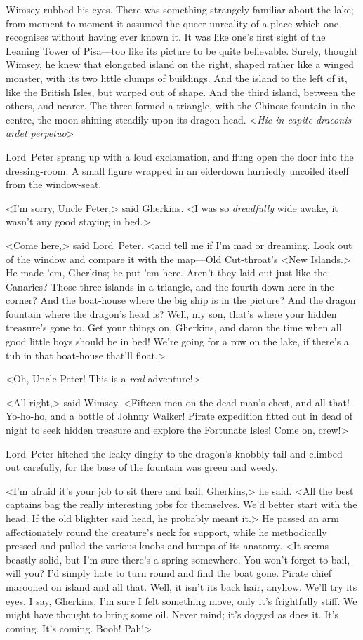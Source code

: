 Wimsey rubbed his eyes. There was something strangely familiar about the lake; from moment to moment it assumed the queer unreality of a place which one recognises without having ever known it. It was like one's first sight of the Leaning Tower of Pisa—too like its picture to be quite believable. Surely, thought Wimsey, he knew that elongated island on the right, shaped rather like a winged monster, with its two little clumps of buildings. And the island to the left of it, like the British Isles, but warped out of shape. And the third island, between the others, and nearer. The three formed a triangle, with the Chinese fountain in the centre, the moon shining steadily upon its dragon head. <\textit{Hic in capite draconis ardet perpetuo}\longdash>

Lord~Peter sprang up with a loud exclamation, and flung open the door into the dressing-room. A small figure wrapped in an eiderdown hurriedly uncoiled itself from the window-seat.

<I'm sorry, Uncle Peter,> said Gherkins. <I was so \textit{dreadfully} wide awake, it wasn't any good staying in bed.>

<Come here,> said Lord~Peter, <and tell me if I'm mad or dreaming. Look out of the window and compare it with the map—Old Cut-throat's <New Islands.> He made 'em, Gherkins; he put 'em here. Aren't they laid out just like the Canaries? Those three islands in a triangle, and the fourth down here in the corner? And the boat-house where the big ship is in the picture? And the dragon fountain where the dragon's head is? Well, my son, that's where your hidden treasure's gone to. Get your things on, Gherkins, and damn the time when all good little boys should be in bed! We're going for a row on the lake, if there's a tub in that boat-house that'll float.>

<Oh, Uncle Peter! This is a \textit{real} adventure!>

<All right,> said Wimsey. <Fifteen men on the dead man's chest, and all that! Yo-ho-ho, and a bottle of Johnny Walker! Pirate expedition fitted out in dead of night to seek hidden treasure and explore the Fortunate Isles! Come on, crew!>

\divider
Lord~Peter hitched the leaky dinghy to the dragon's knobbly tail and climbed out carefully, for the base of the fountain was green and weedy.

<I'm afraid it's your job to sit there and bail, Gherkins,> he said. <All the best captains bag the really interesting jobs for themselves. We'd better start with the head. If the old blighter said head, he probably meant it.> He passed an arm affectionately round the creature's neck for support, while he methodically pressed and pulled the various knobs and bumps of its anatomy. <It seems beastly solid, but I'm sure there's a spring somewhere. You won't forget to bail, will you? I'd simply hate to turn round and find the boat gone. Pirate chief marooned on island and all that. Well, it isn't its back hair, anyhow. We'll try its eyes. I say, Gherkins, I'm sure I felt something move, only it's frightfully stiff. We might have thought to bring some oil. Never mind; it's dogged as does it. It's coming. It's coming. Booh! Pah!>

